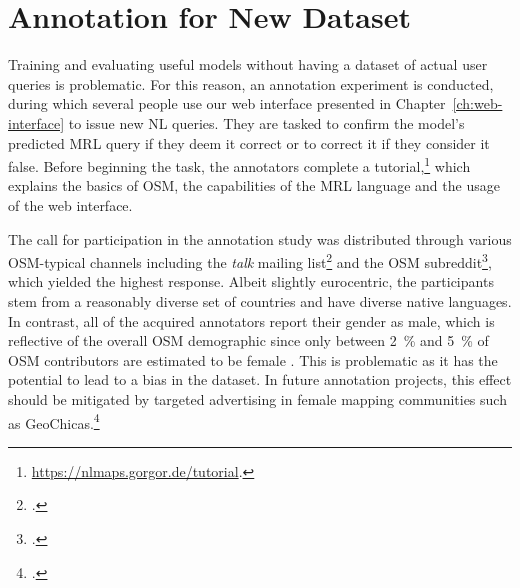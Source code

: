\section{Annotation for New Dataset}
\label{sec:annotation}

Training and evaluating useful \nlmaps{} models without having a dataset of
actual user queries is problematic. For this reason, an annotation experiment is
conducted, during which several people use our web interface presented in
Chapter~\ref{ch:web-interface} to issue new NL queries. They are tasked to
confirm the model’s predicted MRL query if they deem it correct or to correct it
if they consider it false. Before beginning the task, the annotators complete a
tutorial,\footnote{\url{https://nlmaps.gorgor.de/tutorial}.} which explains
the basics of OSM, the capabilities of the MRL language and the usage of the web
interface.

The call for participation in the annotation study was distributed through
various OSM-typical channels including the \emph{talk} mailing
list\footcite{osm-talk} and the OSM subreddit\footcite{osm-subreddit}, which
yielded the highest response. Albeit slightly eurocentric, the participants stem
from a reasonably diverse set of countries and have diverse native languages. In
contrast, all of the acquired annotators report their gender as male, which is
reflective of the overall OSM demographic since only between \SI{2}{\%} and
\SI{5}{\%} of OSM contributors are estimated to be female
\parencites{budhathoki-2010}{stark-2010}{lechner-2011}{klettner-2013}{das-2019}.
This is problematic as it has the potential to lead to a bias in the dataset. In
future annotation projects, this effect should be mitigated by targeted
advertising in female mapping communities such as GeoChicas.\footcite{geochicas}

